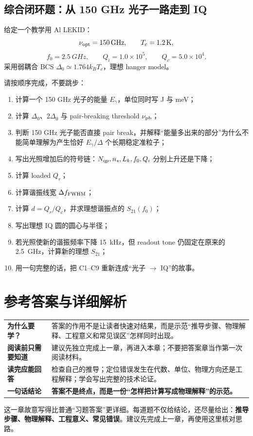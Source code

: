 \documentclass[11pt,a4paper,openany]{ctexrep}
\newcommand{\chapterguide}[4]{%
\begin{tcolorbox}[
  enhanced,
  breakable,
  colback=KidGray!45,
  colframe=KidBlue!65,
  boxrule=0.8pt,
  arc=2mm,
  title=本章导航,
  fonttitle=\bfseries,
  before skip=0.7em,
  after skip=1.0em]
\renewcommand{\arraystretch}{1.18}
\begin{tabularx}{\textwidth}{>{\bfseries\color{KidBlue}}p{3.0cm} X}
为什么要学？ & #1 \\
阅读前只需要知道 & #2 \\
读完应能回答 & #3 \\
一句话结论 & \textbf{#4} \\
\end{tabularx}
\end{tcolorbox}%
}
\begin{document}
\section{综合闭环题：从 150 GHz 光子一路走到 IQ}

\begin{projectbox}
给定一个教学用 Al LEKID：
\[
\nu_{\rm opt}=\SI{150}{GHz},\qquad T_c=\SI{1.2}{K},
\]
\[
f_0=\SI{2.5}{GHz},\qquad Q_i=1.0\times10^5,\qquad Q_c=5.0\times10^4.
\]
采用弱耦合 BCS $\Delta_0\simeq1.764k_BT_c$，理想 hanger model。
\end{projectbox}

请按顺序完成，不要跳步：
\begin{enumerate}[label=\textbf{C\arabic*.}]
  \item 计算一个 150 GHz 光子的能量 $E_\gamma$，单位同时写 J 与 meV；
  \item 计算 $\Delta_0$、$2\Delta_0$ 与 pair-breaking threshold $\nu_{\rm pb}$；
  \item 判断 150 GHz 光子能否直接 pair break，并解释“能量多出来的部分”为什么不能简单理解为产生恰好 $E_\gamma/\Delta$ 个长期稳定准粒子；
  \item 写出光照增加后的符号链：$N_{\rm qp},n_s,L_k,f_0,Q_i$ 分别上升还是下降；
  \item 计算 loaded $Q_r$；
  \item 计算谐振线宽 $\Delta f_{\rm FWHM}$；
  \item 计算 $d=Q_r/Q_c$，并求理想谐振点的 $S_{21}(f_0)$；
  \item 写出理想 IQ 圆的圆心与半径；
  \item 若光照使新的谐振频率下降 \SI{15}{kHz}，但 readout tone 仍固定在原来的 \SI{2.5}{GHz}，计算新的理想 $S_{21}$；
  \item 用一句完整的话，把 C1--C9 重新连成“光子 $\rightarrow$ IQ”的故事。
\end{enumerate}

\clearpage
\chapter{参考答案与详细解析}
\chapterguide
{答案的作用不是让读者快速对结果，而是示范“推导步骤、物理解释、工程意义和常见误区”怎样同时出现。}
{建议先独立完成上一章，再进入本章；不要把答案章当作第一次阅读材料。}
{检查自己的推导；定位错误发生在代数、单位、物理方向还是工程解释；学会写出完整的技术论证。}
{答案不是终点，而是一份“怎样把计算写成物理解释”的示范。}

\begin{goalbox}
这一章故意写得比普通“习题答案”更详细。每道题不仅给结论，还尽量给出：\textbf{推导步骤、物理解释、工程意义、常见错误}。建议先完成上一章，再使用这里核对思路。
\end{goalbox}
\end{document}
